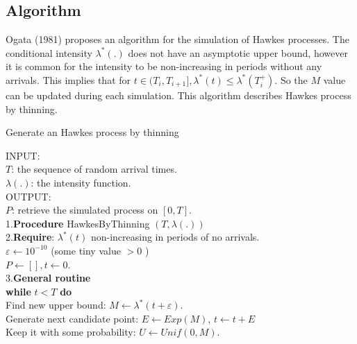 \subsection{Algorithm}
Ogata (1981) proposes an algorithm for the simulation of Hawkes processes. The conditional intensity $\lambda^{*}(.)$ does not have an asymptotic upper bound, however it is common for the intensity to be non-increasing in periods without any arrivals. This implies that for $t \in (T_{i}, T_{i+1}], \lambda^{*}(t) \leq \lambda^{*}(T_{i}^{+})$. So the $M$ value can be updated during each simulation. This algorithm describes Hawkes process by thinning.
\begin{breakablealgorithm}
	\caption{Generate an Hawkes process by thinning}
	\label{Alg:Hawkes_Thinning}
	\begin{algorithmic}[H] \item
		\begin{tabbing}
			INPUT:  \=
			\\
			\> $T$: the sequence of random arrival times.
			\\
			\>$\lambda(.)$: the intensity function.
			\\
			OUTPUT: 
			\\
			\> $P$: retrieve the simulated process on $ [0, T ]$.
			\\
			1.\= \textbf{Procedure} HawkesByThinning $(T,\lambda(.))$
			\\
			2.\textbf{Require}: $\lambda^{*}(t)$ non-increasing in periods of no arrivals.
			\\
			\hspace{0.5cm} $ \varepsilon \leftarrow 10^{-10}$ (some tiny value $> 0$ )
			\\
			\hspace{0.5cm} $P \leftarrow [], t \leftarrow 0.$
			\\
			3.\textbf{General routine}
			\\
			\hspace{0.5cm}\textbf{while} $t < T $ \textbf{do}
			\\
			\hspace{1cm}Find new upper bound: $M \leftarrow \lambda^{*}(t + \varepsilon)$.
			\\
			\hspace{1cm}Generate next candidate point: $E \leftarrow Exp(M)$, $ t \leftarrow t + E $
			\\
			\hspace{1cm}Keep it with some probability: $U \leftarrow Unif(0,M)$.
			\\

\end{tabbing}
\end{algorithmic}
\end{breakablealgorithm}
